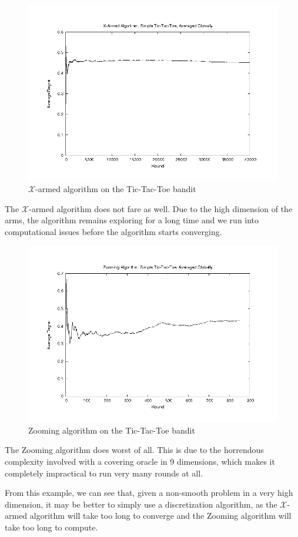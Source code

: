 \begin{figure}[!ht]
  \begin{center}
    \includegraphics[width=\figwidth]{data/tictactoe/xarmtoe_GA.png}
     \caption{$\mathcal{X}$-armed algorithm on the Tic-Tac-Toe bandit}
     \label{fig:xarmtoe}
  \end{center}
\end{figure}
The $\mathcal{X}$-armed algorithm does not fare as well.  Due to the
high dimension of the arms, the algorithm remains exploring for a long
time and we run into computational issues before the algorithm starts
converging.

\begin{figure}[!ht]
  \begin{center}
    \includegraphics[width=\figwidth]{data/tictactoe/zoomtoe_GA.png}
     \caption{Zooming algorithm on the Tic-Tac-Toe bandit}
     \label{fig:zoomtoe}
  \end{center}
\end{figure}
The Zooming algorithm does worst of all.  This is due to the
horrendous complexity involved with a covering oracle in 9 dimensions,
which makes it completely impractical to run very many rounds at all.

From this example, we can see that, given a non-smooth problem in a
very high dimension, it may be better to simply use a discretization
algorithm, as the $\mathcal{X}$-armed algorithm will take too long to
converge and the Zooming algorithm will take too long to compute.
